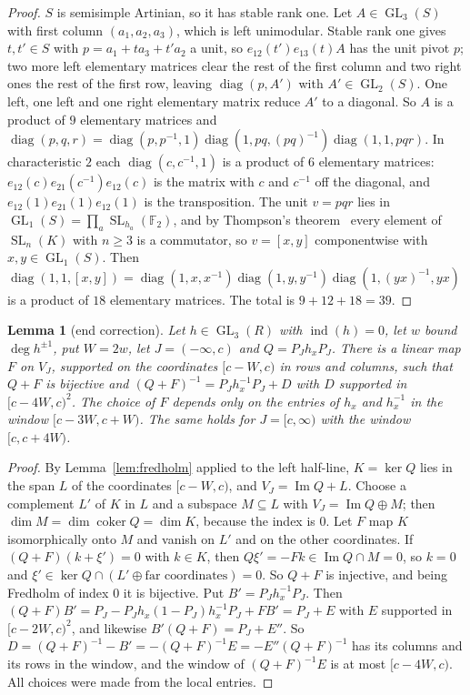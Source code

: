 \documentclass[11pt]{amsart}
\newtheorem{lemma}[theorem]{Lemma}
\theoremstyle{remark}
\newcommand{\F}{\mathbb F}
\newcommand{\GL}{\operatorname{GL}}
\newcommand{\SL}{\operatorname{SL}}
\newcommand{\ind}{\operatorname{ind}}
\begin{document}
\begin{proof}
$S$ is semisimple Artinian, so it has stable rank one. Let
$A\in\GL_3(S)$ with first column $(a_1,a_2,a_3)$, which is left unimodular.
Stable rank one gives $t,t'\in S$ with $p=a_1+ta_3+t'a_2$ a unit, so
$e_{12}(t')e_{13}(t)A$ has the unit pivot $p$; two more left elementary
matrices clear the rest of the first column and two right ones the rest of
the first row, leaving $\operatorname{diag}(p,A')$ with $A'\in\GL_2(S)$. One
left, one left and one right elementary matrix reduce $A'$ to a diagonal.
So $A$ is a product of $9$ elementary matrices and
$\operatorname{diag}(p,q,r)=\operatorname{diag}(p,p^{-1},1)
\operatorname{diag}(1,pq,(pq)^{-1})\operatorname{diag}(1,1,pqr)$.
In characteristic $2$ each $\operatorname{diag}(c,c^{-1},1)$ is a product of
$6$ elementary matrices:
$e_{12}(c)e_{21}(c^{-1})e_{12}(c)$ is the matrix with $c$ and $c^{-1}$ off
the diagonal, and $e_{12}(1)e_{21}(1)e_{12}(1)$ is the transposition.
The unit $v=pqr$ lies in $\GL_1(S)=\prod_a\SL_{h_a}(\F_2)$, and by
Thompson's theorem~\cite{Thompson61} every element of $\SL_n(K)$ with
$n\ge3$ is a commutator, so $v=[x,y]$ componentwise with
$x,y\in\GL_1(S)$. Then
$\operatorname{diag}(1,1,[x,y])=\operatorname{diag}(1,x,x^{-1})
\operatorname{diag}(1,y,y^{-1})\operatorname{diag}(1,(yx)^{-1},yx)$ is a
product of $18$ elementary matrices. The total is $9+12+18=39$.
\end{proof}

\begin{lemma}[end correction]\label{lem:T3}
Let $h\in\GL_3(R)$ with $\ind(h)=0$, let $w$ bound $\deg h^{\pm1}$, put
$W=2w$, let $J=(-\infty,c)$ and $Q=P_Jh_xP_J$. There is a linear map $F$
on $V_J$, supported on the coordinates $[c-W,c)$ in rows and columns, such
that $Q+F$ is bijective and $(Q+F)^{-1}=P_Jh_x^{-1}P_J+D$ with $D$
supported in $[c-4W,c)^2$. The choice of $F$ depends only on the entries
of $h_x$ and $h_x^{-1}$ in the window $[c-3W,c+W)$. The same holds for
$J=[c,\infty)$ with the window $[c,c+4W)$.
\end{lemma}

\begin{proof}
By Lemma~\ref{lem:fredholm} applied to the left half-line, $K=\ker Q$ lies
in the span $L$ of the coordinates $[c-W,c)$, and $V_J=\operatorname{Im}Q+L$.
Choose a complement $L'$ of $K$ in $L$ and a subspace $M\subseteq L$ with
$V_J=\operatorname{Im}Q\oplus M$; then $\dim M=\dim\operatorname{coker}Q
=\dim K$, because the index is $0$. Let $F$ map $K$ isomorphically onto
$M$ and vanish on $L'$ and on the other coordinates. If $(Q+F)(k+\xi')=0$
with $k\in K$, then $Q\xi'=-Fk\in\operatorname{Im}Q\cap M=0$, so $k=0$ and
$\xi'\in\ker Q\cap(L'\oplus\text{far coordinates})=0$. So $Q+F$ is
injective, and being Fredholm of index $0$ it is bijective. Put
$B'=P_Jh_x^{-1}P_J$. Then $(Q+F)B'=P_J-P_Jh_x(1-P_J)h_x^{-1}P_J+FB'
=P_J+E$ with $E$ supported in $[c-2W,c)^2$, and likewise $B'(Q+F)=P_J+E''$.
So $D=(Q+F)^{-1}-B'=-(Q+F)^{-1}E=-E''(Q+F)^{-1}$ has its columns and its
rows in the window, and the window of $(Q+F)^{-1}E$ is at most $[c-4W,c)$.
All choices were made from the local entries.
\end{proof}
\end{document}
